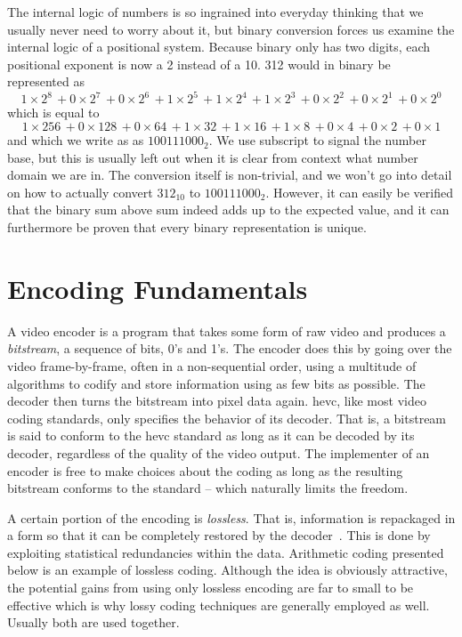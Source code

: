 The internal logic of numbers is so ingrained into everyday thinking that we usually never need to worry about it, but binary conversion forces us examine the internal logic of a positional system. Because binary only has two digits, each positional exponent is now a 2 instead of a 10. 312 would in binary be represented as $$1 \times 2^8\, + 0 \times 2^7\, + 0 \times 2^6\, + 1 \times 2^5\, + 1 \times 2^4\, + 1 \times 2^3\, + 0 \times 2^2\, + 0 \times 2^1\, + 0 \times 2^0$$ which is equal to $$1 \times 256\, + 0 \times 128\, + 0 \times 64\, + 1 \times 32\, + 1 \times 16\, + 1 \times 8\, + 0 \times 4\, + 0 \times 2\, + 0 \times 1$$ and which we write as as $100111000_{2}$. We use subscript to signal the number base, but this is usually left out when it is clear from context what number domain we are in. The conversion itself is non-trivial, and we won't go into detail on how to actually convert $312_{10}$ to $100111000_{2}$. However, it can easily be verified that the binary sum above sum indeed adds up to the expected value, and it can furthermore be proven that every binary representation is unique.


\section{Encoding Fundamentals}

A video encoder is a program that takes some form of raw video and produces a \textit{bitstream}, a sequence of bits, 0's and 1's. The encoder does this by going over the video frame-by-frame, often in a non-sequential order, using a multitude of algorithms to codify and store information using as few bits as possible. The decoder then turns the bitstream into pixel data again. \Gls{hevc}, like most video coding standards, only specifies the behavior of its decoder. That is, a bitstream is said to conform to the \gls{hevc} standard as long as it can be decoded by its decoder, regardless of the quality of the video output. The implementer of an encoder is free to make choices about the coding as long as the resulting bitstream conforms to the standard -- which naturally limits the freedom.

A certain portion of the encoding is \textit{lossless}. That is, information is repackaged in a form so that it can be completely restored by the decoder~\cite{Flierl}. This is done by exploiting statistical redundancies within the data. Arithmetic coding presented below is an example of lossless coding. Although the idea is obviously attractive, the potential gains from using only lossless encoding are far to small to be effective which is why lossy coding techniques are generally employed as well. Usually both are used together.

